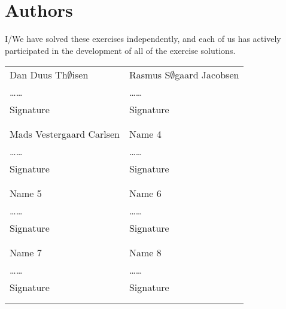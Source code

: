 \documentclass{article}
\begin{document}
\newpage
\section{Authors}
I/We have solved these exercises independently, and each of us has actively
participated in the development of all of the exercise solutions.
\vspace{1cm}

\noindent
\begin{tabular}{p{70mm}p{70mm}}

%
%

Dan Duus Th$\emptyset$isen & Rasmus S$\emptyset$gaard Jacobsen \\
\dots\dotfill\dots & \dots\dotfill\dots \\
Signature & Signature \\
& \\
& \\

Mads Vestergaard Carlsen & Name 4 \\
\dots\dotfill\dots & \dots\dotfill\dots \\
Signature & Signature \\
& \\
& \\

Name 5 & Name 6 \\
\dots\dotfill\dots & \dots\dotfill\dots \\
Signature & Signature \\
& \\
& \\

Name 7 & Name 8 \\
\dots\dotfill\dots & \dots\dotfill\dots \\
Signature & Signature \\
& \\
& \\
\end{tabular}
\end{document}
